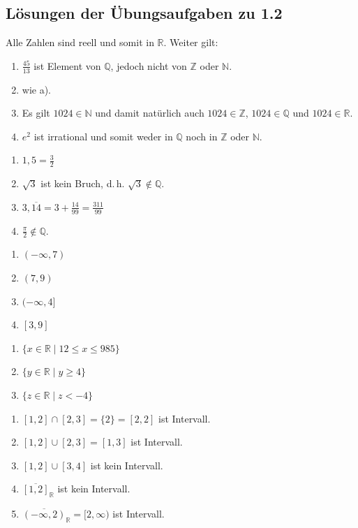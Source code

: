 \subsection{Lösungen der Übungsaufgaben zu 1.2}

Alle Zahlen sind reell und somit in $\mathbb{R}$. Weiter gilt:
\begin{enumerate}[label=\alph*)]
  \item $\tfrac{45}{13}$ ist Element von $\mathbb{Q}$, jedoch nicht von $\mathbb{Z}$ oder $\mathbb{N}$.
  \item wie a).
  \item Es gilt $1024 \in \mathbb{N}$ und damit natürlich auch $1024 \in \mathbb{Z}$, $1024 \in \mathbb{Q}$ und $1024 \in \mathbb{R}$.
  \item $e^2$ ist irrational und somit weder in $\mathbb{Q}$ noch in $\mathbb{Z}$ oder $\mathbb{N}$.
\end{enumerate}

\begin{enumerate}[label=\alph*)]
  \item $1{,}5 = \tfrac{3}{2}$
  \item $\sqrt{3}$ ist kein Bruch, d.\,h. $\sqrt{3} \notin \mathbb{Q}$.
  \item $3{,}\overline{14} = 3 + \tfrac{14}{99} = \tfrac{311}{99}$
  \item $\tfrac{\pi}{2} \notin \mathbb{Q}$.
\end{enumerate}

\begin{enumerate}[label=\alph*)]
  \item $(-\infty,7)$
  \item $(7,9)$
  \item $(-\infty,4]$
  \item $[3,9]$
\end{enumerate}

\begin{enumerate}[label=\alph*)]
  \item $\{x \in \mathbb{R} \mid 12 \leq x \leq 985\}$
  \item $\{y \in \mathbb{R} \mid y \geq 4\}$
  \item $\{z \in \mathbb{R} \mid z < -4\}$
\end{enumerate}

\begin{enumerate}[label=\alph*)]
  \item $[1,2] \cap [2,3] = \{2\} = [2,2]$ ist Intervall.
  \item $[1,2] \cup [2,3] = [1,3]$ ist Intervall.
  \item $[1,2] \cup [3,4]$ ist kein Intervall.
  \item $\overline{[1,2]}_{\mathbb{R}}$ ist kein Intervall.
  \item $\overline{(-\infty,2)}_{\mathbb{R}} = [2,\infty)$ ist Intervall.
\end{enumerate}

